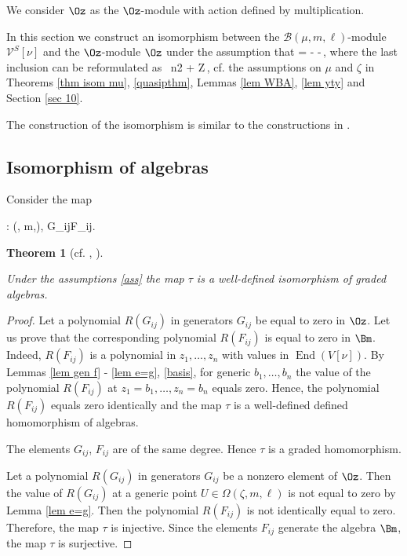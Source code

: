\documentclass[12pt]{amsart}
\newtheorem{thm}{Theorem}[section]
\numberwithin{equation}{section}
\theoremstyle{definition}
\let\mc\mathcal
\let\Om\Omega
\let\on\operatorname
\def\C{{\mathbb C}}
\def\Z{{\mathbb Z}}
\def\B{{\mc B}}
\def\V{{\mc V}}
\def\End{\on{End}}
\begin{document}
\smallskip
 We  consider $\Oz$ as the $\Oz$-module with action defined by
 multiplication. 

\smallskip
In this section we construct an isomorphism between the $\B(\mu, m,\ell)$-module $\V^S[\nu]$
and the $\Oz$-module $\Oz$ under the assumption that
\bean
\label{ass}
\zeta = \frac{} - \frac {}\quad \on{and} \quad \zeta\in \C-\frac 12\Z\,,
\eean
where the last inclusion can be reformulated as 
\bean
\label{assm}
\mu\notin\ \frac n2 + \Z\,,
\eean
cf. the
assumptions on $\mu$ and $\zeta$ in Theorems \ref{thm isom mu}, \ref{quasipthm}, 
 Lemmas \ref{lem WBA}, \ref{lem yty} and Section \ref{sec 10}.

\smallskip
The construction of the isomorphism is similar to the constructions in \cite{MTV3, MTV2}.


\subsection{Isomorphism of algebras}

Consider the map

\bea
\tau  :  \Oz \to \B(\mu, m,\ell), \quad G_{ij}\mapsto F_{ij}.
\eea
${}$

\begin{thm}
[cf. {\cite[Theorem 5.3]{MTV3}}, {\cite[Theorem 6.3]{MTV2}}]
\label{thm isoa}

Under the assumptions \eqref{ass}
the map $\tau$ is a well-defined 
isomorphism of graded algebras.

\end{thm}

\begin{proof} 
Let a polynomial $R(G_{ij})$ in generators $G_{ij}$  be equal to zero in
$\Oz$. Let us prove that the
corresponding polynomial $R(F_{ij})$ is equal to zero in $\Bm$.
Indeed, $R(F_{ij})$ is a polynomial
in $z_1,\dots,z_n$ with values in $\End(V[\nu])$. By Lemmas \ref{lem gen f} - \ref{lem e=g},
 \ref{basis}, for generic $b_1,\dots,b_n$ the
 value of the polynomial $R(F_{ij})$ at
$z_1 = b_1,\dots, z_n=b_n$ equals zero. Hence, the polynomial $R(F_{ij})$ equals zero identically and
the map $\tau$ is a well-defined defined homomorphism of algebras.

The elements $G_{ij}$, $F_{ij}$ are of the same degree. Hence  $\tau$ is a graded homomorphism.

Let a polynomial $R(G_{ij})$ in generators  $G_{ij}$ be a nonzero element of
$\Oz$. Then the value of
$R(G_{ij})$ at a generic point $U \in \Om(\zeta, m,\ell)$ is not equal to zero by Lemma \ref{lem e=g}.
Then the polynomial $R(F_{ij})$ is not identically equal to zero. Therefore, the map $\tau$ is injective.
Since the elements $F_{ij}$ generate the algebra $\Bm$, the map $\tau$ is surjective.
\end{proof}
\end{document}
